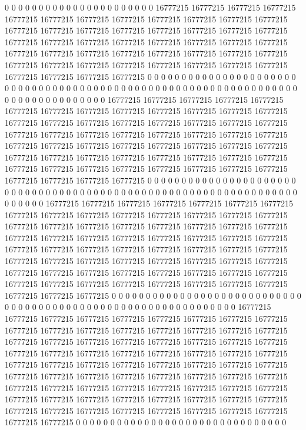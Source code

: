 0 0 0 0 0 0 0 0 0 0 0 0 0 0 0 0 0 0 0 0 0 0 16777215 16777215 16777215 16777215 16777215 16777215 16777215 16777215 16777215 16777215 16777215 16777215 16777215 16777215 16777215 16777215 16777215 16777215 16777215 16777215 16777215 16777215 16777215 16777215 16777215 16777215 16777215 16777215 16777215 16777215 16777215 16777215 16777215 16777215 16777215 16777215 16777215 16777215 16777215 16777215 16777215 16777215 16777215 16777215 16777215 16777215 16777215 16777215 0 0 0 0 0 0 0 0 0 0 0 0 0 0 0 0 0 0 0 0 0 0 0 0 0 0 0 0 0 0 0 0 0 0 0 0 0 0 0 0 0 0 0 0 0 0 0 0 0 0 0 0 0 0 0 0 0 0
0 0 0 0 0 0 0 0 0 0 0 0 0 0 0 0 0 0 0 0 0 0 16777215 16777215 16777215 16777215 16777215 16777215 16777215 16777215 16777215 16777215 16777215 16777215 16777215 16777215 16777215 16777215 16777215 16777215 16777215 16777215 16777215 16777215 16777215 16777215 16777215 16777215 16777215 16777215 16777215 16777215 16777215 16777215 16777215 16777215 16777215 16777215 16777215 16777215 16777215 16777215 16777215 16777215 16777215 16777215 16777215 16777215 16777215 16777215 16777215 16777215 16777215 16777215 16777215 16777215 16777215 16777215 16777215 0 0 0 0 0 0 0 0 0 0 0 0 0 0 0 0 0 0 0 0 0 0 0 0 0 0 0 0 0 0 0 0 0 0 0 0 0 0 0 0 0 0 0 0 0 0 0 0 0
0 0 0 0 0 0 0 0 0 0 0 0 0 0 0 0 0 0 0 0 0 0 16777215 16777215 16777215 16777215 16777215 16777215 16777215 16777215 16777215 16777215 16777215 16777215 16777215 16777215 16777215 16777215 16777215 16777215 16777215 16777215 16777215 16777215 16777215 16777215 16777215 16777215 16777215 16777215 16777215 16777215 16777215 16777215 16777215 16777215 16777215 16777215 16777215 16777215 16777215 16777215 16777215 16777215 16777215 16777215 16777215 16777215 16777215 16777215 16777215 16777215 16777215 16777215 16777215 16777215 16777215 16777215 16777215 16777215 16777215 16777215 16777215 16777215 16777215 16777215 16777215 16777215 0 0 0 0 0 0 0 0 0 0 0 0 0 0 0 0 0 0 0 0 0 0 0 0 0 0 0 0 0 0 0 0 0 0 0 0 0 0 0 0
0 0 0 0 0 0 0 0 0 0 0 0 0 0 0 0 0 0 0 0 0 0 16777215 16777215 16777215 16777215 16777215 16777215 16777215 16777215 16777215 16777215 16777215 16777215 16777215 16777215 16777215 16777215 16777215 16777215 16777215 16777215 16777215 16777215 16777215 16777215 16777215 16777215 16777215 16777215 16777215 16777215 16777215 16777215 16777215 16777215 16777215 16777215 16777215 16777215 16777215 16777215 16777215 16777215 16777215 16777215 16777215 16777215 16777215 16777215 16777215 16777215 16777215 16777215 16777215 16777215 16777215 16777215 16777215 16777215 16777215 16777215 16777215 16777215 16777215 16777215 16777215 16777215 16777215 16777215 16777215 16777215 16777215 16777215 16777215 16777215 16777215 0 0 0 0 0 0 0 0 0 0 0 0 0 0 0 0 0 0 0 0 0 0 0 0 0 0 0 0 0 0 0
